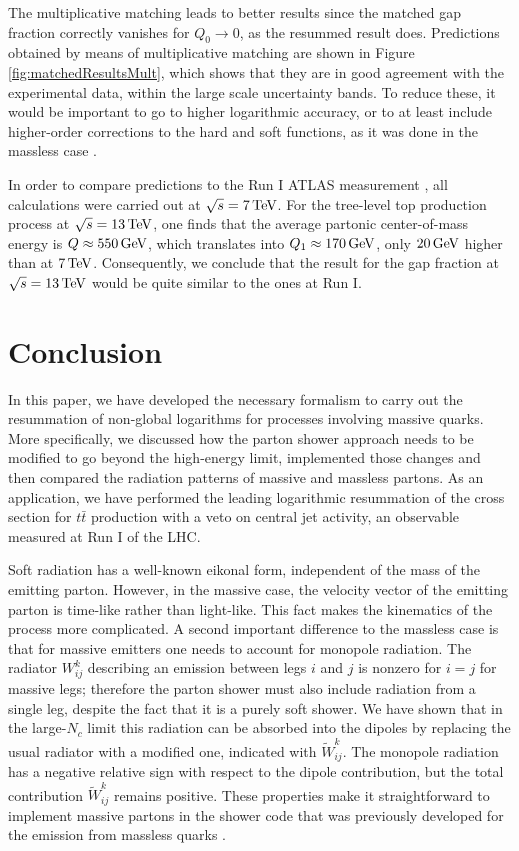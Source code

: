 \documentclass[11pt,a4paper]{article}
\begin{document}
The multiplicative matching leads to better results since the matched gap fraction correctly vanishes for $Q_0\to 0$, as the resummed result does. Predictions obtained by means of multiplicative matching are shown in Figure \ref{fig:matchedResultsMult}, which shows that they are in good agreement with the experimental data, within the large scale uncertainty bands. To reduce these, it would be important to go to higher logarithmic accuracy, or to at least include higher-order corrections to the hard and soft functions, as it was done in the massless case \cite{Balsiger:2019tne}. 

In order to compare predictions  to the Run I ATLAS measurement  \cite{ATLAS:2012al}, all calculations were carried out at $\sqrt{s}= 7\,{\rm TeV}$. For the tree-level top production process at $\sqrt{s}= 13\,{\rm TeV}$, one finds that the average partonic center-of-mass energy is $Q\approx 550\,{\rm GeV}$, which translates into $Q_1 \approx 170\,{\rm GeV}$, only $20\,{\rm GeV}$ higher than at $7\,{\rm TeV}$. Consequently, we conclude that the result for the gap fraction at $\sqrt{s}= 13\,{\rm TeV}$ would be quite similar to the ones at Run I.

\section{Conclusion }\label{sec:conclusion}

In this paper, we have developed the necessary formalism to carry out the resummation of non-global logarithms for processes involving massive quarks. More specifically, we discussed how the parton shower approach needs to be modified to go beyond the high-energy limit, implemented those changes and then compared the radiation patterns of massive and massless partons. As an application, we have performed the leading logarithmic resummation of the cross section for $t\bar{t}$ production with a veto on central jet activity, an observable measured at  Run I of the LHC. 

Soft radiation has a well-known eikonal form, independent of the mass of the emitting parton. However, in the massive case, the velocity vector of the emitting parton is time-like rather than light-like. This fact makes the kinematics of the process more complicated. A second important difference to the massless case is that for massive emitters one needs to account for monopole radiation. The radiator $W_{ij}^k$ describing an emission between legs $i$ and $j$ is nonzero for $i=j$ for massive legs; therefore the parton shower must also include radiation from a single leg, despite the fact that it is a purely soft shower. We have shown that in the large-$N_c$ limit this radiation can be absorbed into the dipoles by replacing the usual radiator with a modified one, indicated with $\widetilde{W}_{ij}^k$. The monopole radiation has a negative relative sign with respect to the dipole contribution, but the total contribution $\widetilde{W}_{ij}^k$ remains positive. These properties make it straightforward to implement massive partons in the shower code that was previously developed for the emission from massless quarks \cite{Balsiger:2018ezi,Balsiger:2019tne}.
\end{document}
